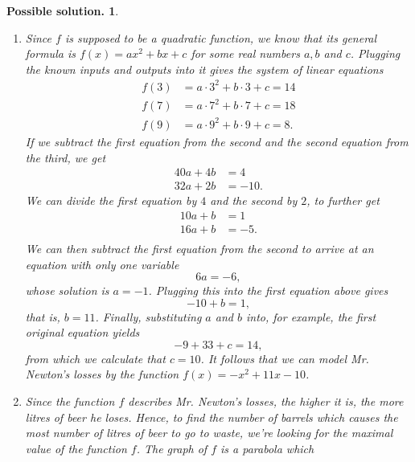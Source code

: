 \documentclass[a4paper,11pt]{article}
\newtheorem*{solution}{Possible solution.}
\begin{document}
\begin{solution}
 \hfill
 \begin{enumerate}
  \item Since $f$ is supposed to be a quadratic function, we know that its
   general formula is $f(x) = ax^2 + bx + c$ for some real numbers $a,b$ and
   $c$. Plugging the known inputs and outputs into it gives the system of linear
   equations
   \begin{equation*}
    \begin{split}
     f(3) &= a \cdot 3^2 + b \cdot 3 + c = 14\\
     f(7) &= a \cdot 7^2 + b \cdot 7 + c = 18\\
     f(9) &= a \cdot 9^2 + b \cdot 9 + c = 8.
    \end{split}
   \end{equation*}
   If we subtract the first equation from the second and the second equation
   from the third, we get
   \begin{equation*}
    \begin{split}
     40a + 4b &= 4 \\
     32a + 2b &= -10.
    \end{split}
   \end{equation*}
   We can divide the first equation by $4$ and the second by $2$, to further get
   \begin{equation*}
    \begin{split}
     10a + b &= 1 \\
     16a + b &= -5. \\
    \end{split}
   \end{equation*}
   We can then subtract the first equation from the second to arrive at an
   equation with only one variable
   \[
    6a = -6,
   \]
   whose solution is $a = -1$. Plugging this into the first equation above gives
   \[
    -10 + b = 1,
   \]
   that is, $b = 11$. Finally, substituting $a$ and $b$ into, for example, the
   first original equation yields
   \[
    -9 + 33 + c = 14,
   \]
   from which we calculate that $c = 10$. It follows that we can model Mr.
   Newton's losses by the function $f(x) = -x^2 + 11x - 10$.
  \item Since the function $f$ describes Mr. Newton's losses, the higher it is,
   the more litres of beer he loses. Hence, to find the number of barrels which
   causes the most number of litres of beer to go to waste, we're looking for
   the maximal value of the function $f$. The graph of $f$ is a parabola which

\end{enumerate}
\end{solution}
\end{document}
